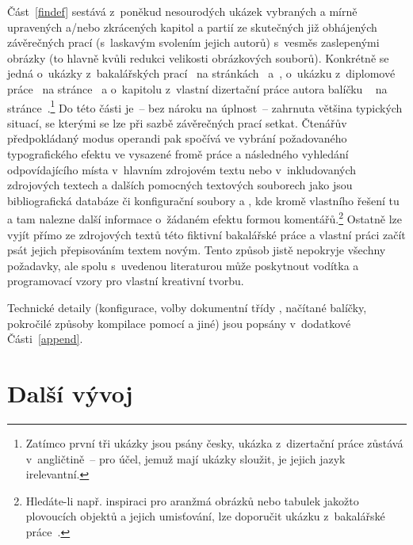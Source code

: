 Část~\ref{findef} sestává z~poněkud nesourodých ukázek vybraných a mírně
upravených a/nebo zkrácených kapitol a partií ze skutečných již obhájených
závěrečných prací (s~laskavým svolením jejich autorů) s~vesměs zaslepenými
obrázky (to hlavně kvůli redukci velikosti obrázkových souborů). Konkrétně se
jedná o~ukázky z~bakalářských prací~\cite{Val:2015:BcProj:NumMagLev,%
  Bry:2007:BcProj:ModMedDiag} na stránkách~\pageref{SpinLev}
a~\pageref{princtwo}, o~ukázku z~diplomové
práce~\cite{Fab:2017:DipProj:PorSnimkuOpAnObr} na stránce~\pageref{CAPczm} a
o~kapitolu z~vlastní dizertační práce autora balíčku
\pkg{\ipotname}~\cite{Hle:2014:PhDThes:Polytropes} na
stránce~\pageref{Chap:Uniform}.\footnote{Zatímco první tři ukázky jsou psány
  česky, ukázka z~dizertační práce zůstává v~angličtině~-- pro účel, jemuž
  mají ukázky sloužit, je jejich jazyk irelevantní.} Do této části je~-- bez
nároku na úplnost~-- zahrnuta většina typických situací, se kterými se lze při
sazbě závěrečných prací setkat. Čtenářův předpokládaný modus operandi pak
spočívá ve vybrání požadovaného typografického efektu ve vysazené fromě práce
a následného vyhledání odpovídajícího místa v~hlavním zdrojovém textu
 nebo v~inkludovaných zdrojových textech
 a dalších pomocných textových souborech jako jsou
bibliografická databáze  či konfigurační soubory
 a , kde kromě vlastního řešení tu a tam
nalezne další informace o~žádaném efektu formou komentářů.\footnote{Hledáte-li
  např. inspiraci pro aranžmá obrázků nebo tabulek jakožto plovoucích objektů
  a jejich umisťování, lze doporučit ukázku z~bakalářské
  práce~\cite{Bry:2007:BcProj:ModMedDiag}.} Ostatně lze vyjít přímo ze
zdrojových textů této fiktivní bakalářské práce a vlastní práci začít psát
jejich přepisováním textem novým. Tento způsob 
jistě nepokryje všechny požadavky, ale spolu s~uvedenou literaturou může
poskytnout vodítka a programovací vzory pro vlastní kreativní tvorbu.

Technické detaily (konfigurace, volby dokumentní třídy ,
načítané balíčky, pokročilé způsoby kompilace pomocí  a jiné) jsou
popsány v~dodatkové Části~\ref{append}.

\section*{Další vývoj}\label{furtherdev}%

